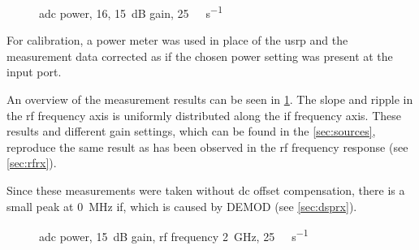 \documentclass[12pt,a4paper,parskip=full,abstracton]{scrartcl}
\begin{document}
\begin{figure}[htb]
    \centering
{}
    \caption{\gls{adc} power, \SI{16}{\bit}, \SI{15}{\deci\bel} gain, \SI{25}{\mega\samples\per\second}}
    \label{fig:rfifrx16}
\end{figure}

For calibration, a power meter was used in place of the \gls{usrp} and the measurement
data corrected as if the chosen power setting was present at the input port.

An overview of the measurement results can be seen in \cref{fig:rfifrx16}. The slope and ripple
in the \gls{rf} frequency axis is uniformly distributed along the \gls{if} frequency axis.
These results and different gain settings, which can be found in the \cref{sec:sources},
reproduce the same result as has been observed in the \gls{rf} frequency response (see \cref{sec:rfrx}).

Since these measurements were taken without \gls{dc} offset compensation, there is a small peak at 
\SI{0}{\mega\hertz} \gls{if}, which is caused by DEMOD (see \cref{sec:dsprx}).

\begin{figure}[htb]
    \centering
{}
    \caption{\gls{adc} power, \SI{15}{\deci\bel} gain, \gls{rf} frequency \SI{2}{\giga\hertz}, \SI{25}{\mega\samples\per\second}}
    \label{fig:ifrx25}
\end{figure}
\end{document}
